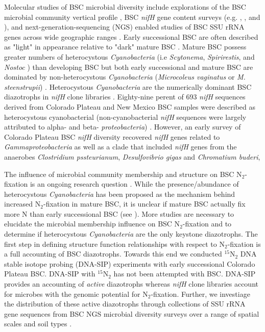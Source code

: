 Molecular studies of BSC microbial diversity include explorations of the BSC
microbial community vertical profile \citep{Garcia_Pichel_2003}, BSC
\textit{nifH} gene content surveys (e.g. \citet{14766579}, \citet{Yeager_2012},
\citet{Yeager} and \citet{Steppe_1996}), and next-generation-sequencing (NGS)
enabled studies of BSC SSU rRNA genes across wide geographic ranges
\citep{Garcia_Pichel_2013, Steven_2013}. Early successional  BSC are often
described as "light" in appearance relative to "dark" mature BSC
\citep{Belnap_2002, 14766579}. Mature BSC possess greater numbers of
heterocystous \textit{Cyanobacteria} (i.e \textit{Scytonema},
\textit{Spirirestis}, and \textit{Nostoc} \citep{Yeager, Yeager_2012}) than
developing BSC but both early successional and mature BSC are dominated by
non-heterocystous \textit{Cyanobacteria} (\textit{Microcoleus vaginatus} or
\textit{M. steenstrupii}) \citep{14766579, Garcia_Pichel_2013}.  Heterocystous
\textit{Cyanobacteria} are the numerically dominant BSC diazotrophs in
\textit{nifH} clone libraries \citep{Yeager, 14766579, Yeager_2012}.
Eighty-nine perent of 693 \textit{nifH} sequences derived from Colorado Plateau and
New Mexico BSC samples were described as heterocystous cyanobacterial
(non-cyanobacterial \textit{nifH} sequences were largely attributed to alpha-
and beta- \textit{proteobacteria}) \citet{Yeager}. However, an early survey of
Colorado Plateau BSC \textit{nifH} diversity recovered \textit{nifH} genes
related to \textit{Gammaproteobacteria} as well as a clade that included
\textit{nifH} genes from the anaerobes \textit{Clostridium pssteurianum},
\textit{Desulfovibrio gigas} and \textit{Chromatium buderi},

The influence of microbial community membership and structure on BSC
N$_{2}$-fixation is an ongoing research question \citep{Belnap28062013}. While
the presence/abundance of heterocystous \textit{Cyanobacteria} has been
proposed as the mechanism behind increased N$_{2}$-fixation in mature BSC, it
is unclear if mature BSC actually fix more N than early successional BSC (see
\citet{15643930}). More studies are necessary to elucidate the microbial
membership influence on BSC N$_{2}$-fixation and to determine if heterocystous
\textit{Cyanobacteria} are the only keystone diazotrophs. The first step in
defining structure function relationships with respect to N$_{2}$-fixation is a
full accounting of BSC diazotrophs. Towards this end we conducted
$^{15}$N$_{2}$ DNA stable isotope probing (DNA-SIP) experiments with early
successional Colorado Plateau BSC.  DNA-SIP with $^{15}$N$_{2}$ has not been
attempted with BSC. DNA-SIP provides an accounting of \textit{active}
diazotrophs whereas \textit{nifH} clone libraries account for microbes with the
genomic potential for N$_{2}$-fixation.  Further, we investiage the
distribution of these active diazotrophs through collections of SSU rRNA
gene sequences from BSC NGS microbial diversity surveys over a range of spatial
scales and soil types \citep{Garcia_Pichel_2013, Steven_2013}. 
